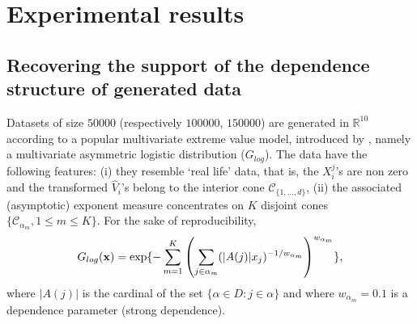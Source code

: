 
\section{Experimental results}
\label{jmva:sec:experiments}
\subsection{Recovering the support of the dependence structure of generated data}
Datasets of size $50000$ (respectively $100000$, $150000$) are  generated in $\mathbb{R}^{10}$ according to a popular multivariate extreme value
model, introduced by \cite{Tawn90},  namely a multivariate asymmetric
logistic distribution ($G_{log}$). %
The data have the following features: (i) they resemble `real life'
data, that is, the $X_i^j$'s are non
zero  and the transformed $\hat V_i$'s belong to the interior cone
$\mathcal{C}_{\{1,\ldots,d\}}$, (ii) the associated (asymptotic) exponent measure concentrates on
 $K$ disjoint cones $\{\mathcal{C}_{\alpha_m} , 1\le m\le K\}$.  %
 For the sake of reproducibility, %
 $$ G_{log}(\mathbf x) = \exp\{ - \sum_{m = 1}^K \left(\sum_{j \in \alpha_m}
     (|A(j)|x_j)^{ - 1/{w_{\alpha_m}}}\right)^{w_{\alpha_m}} \}, $$
 where $|A(j)|$ is the cardinal of the set $\{\alpha\in D: j \in
 \alpha\}$ and where $w_{\alpha_m} = 0.1$ is a dependence parameter
 (strong dependence). %
